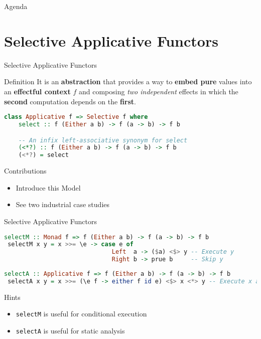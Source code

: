 \documentclass{beamer}
\begin{document}
\begin{frame}{Agenda}
  \section{Selective Applicative Functors}
  \tableofcontents[currentsection]
\end{frame}

\begin{frame}[fragile]{Selective Applicative Functors}

  \begin{block}{Definition}
    It is an \textbf{abstraction} that provides a way to \textbf{embed pure}
    values into an \textbf{effectful context} $f$ and
    composing \textit{two independent} effects in which the \textbf{second} computation
    depends on the \textbf{first}.
  \end{block}

\begin{lstlisting}[language=Haskell]
  class Applicative f => Selective f where
    select :: f (Either a b) -> f (a -> b) -> f b

    -- An infix left-associative synonym for select
    (<*?) :: f (Either a b) -> f (a -> b) -> f b
    (<*?) = select 
\end{lstlisting}
  
  \begin{block}{Contributions}
    \begin{itemize}
    \item Introduce this Model
    \item See two industrial case studies 
    \end{itemize}
  \end{block}

\end{frame}

\begin{frame}[fragile]{Selective Applicative Functors}

\begin{lstlisting}[language=Haskell]
 selectM :: Monad f => f (Either a b) -> f (a -> b) -> f b
 selectM x y = x >>= \e -> case e of 
                              Left  a -> ($a) <$> y -- Execute y
                              Right b -> prue b     -- Skip y
\end{lstlisting}

\begin{lstlisting}[language=Haskell]
 selectA :: Applicative f => f (Either a b) -> f (a -> b) -> f b
 selectA x y = x >>= (\e f -> either f id e) <$> x <*> y -- Execute x and y 
\end{lstlisting}

  \begin{block}{Hints}
    \begin{itemize}
    \item \lstinline{selectM} is useful for conditional execution
    \item \lstinline{selectA} is useful for static analysis
    \end{itemize}
  \end{block}
  
\end{frame}
\end{document}
